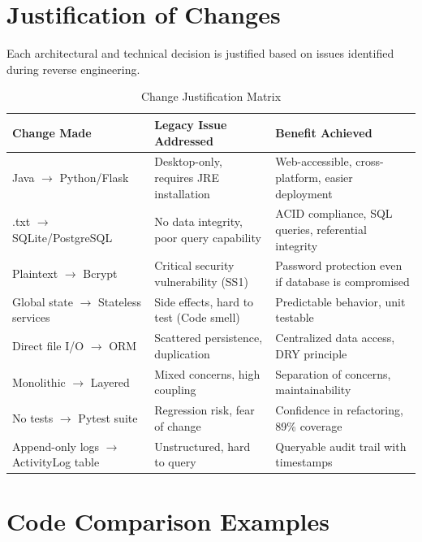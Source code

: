 \section{Justification of Changes}

Each architectural and technical decision is justified based on issues
identified during reverse engineering.

\begin{table}[h]
  \centering
  \caption{Change Justification Matrix}
  \begin{tabular}{p{3.5cm} p{4cm} p{5.5cm}}
    \toprule
    \textbf{Change Made} & \textbf{Legacy Issue Addressed} & \textbf{Benefit Achieved} \\
    \midrule
    Java $\rightarrow$ Python/Flask &
      Desktop-only, requires JRE installation &
      Web-accessible, cross-platform, easier deployment \\
    \midrule
    .txt $\rightarrow$ SQLite/PostgreSQL &
      No data integrity, poor query capability &
      ACID compliance, SQL queries, referential integrity \\
    \midrule
    Plaintext $\rightarrow$ Bcrypt &
      Critical security vulnerability (SS1) &
      Password protection even if database is compromised \\
    \midrule
    Global state $\rightarrow$ Stateless services &
      Side effects, hard to test (Code smell) &
      Predictable behavior, unit testable \\
    \midrule
    Direct file I/O $\rightarrow$ ORM &
      Scattered persistence, duplication &
      Centralized data access, DRY principle \\
    \midrule
    Monolithic $\rightarrow$ Layered &
      Mixed concerns, high coupling &
      Separation of concerns, maintainability \\
    \midrule
    No tests $\rightarrow$ Pytest suite &
      Regression risk, fear of change &
      Confidence in refactoring, 89\% coverage \\
    \midrule
    Append-only logs $\rightarrow$ ActivityLog table &
      Unstructured, hard to query &
      Queryable audit trail with timestamps \\
    \bottomrule
  \end{tabular}
\end{table}

\section{Code Comparison Examples}

